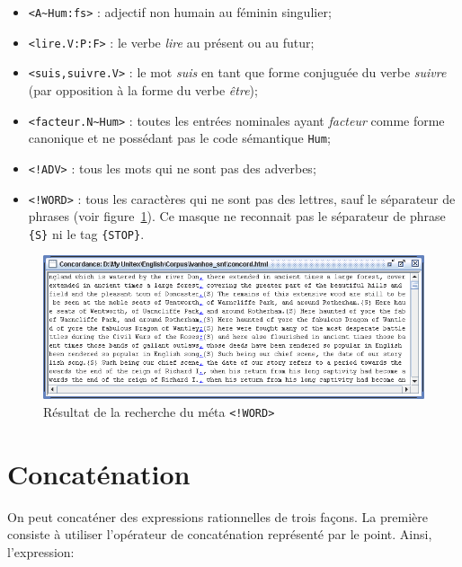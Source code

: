 \begin{itemize}
  \item \verb$<A~Hum:fs>$ : adjectif non humain au féminin singulier;
  \item \verb+<lire.V:P:F>+ : le verbe \textit{lire} au présent ou au futur;
  \item \verb$<suis,suivre.V>$ : le mot \textit{suis} en tant que forme conjuguée du verbe
  	  \textit{suivre}
  	  (par opposition à la forme du verbe \textit{être});
  \item \verb$<facteur.N~Hum>$ : toutes les entrées nominales ayant \textit{facteur} comme forme
  	  canonique et ne possédant pas le code sémantique \verb+Hum+;
  \item \verb$<!ADV>$ : tous les mots qui ne sont pas des adverbes;
  \item \verb$<!WORD>$ : tous les caractères qui ne sont pas des lettres, sauf le séparateur de
  	  phrases
  	  (voir figure~\ref{fig-search-<!WORD>}). Ce masque ne reconnait pas le séparateur de phrase
  	  \verb+{S}+
  	  ni le tag \verb+{STOP}+.
\end{itemize}

\bigskip
\begin{figure}[!ht]
\begin{center}
\includegraphics[width=15cm]{resources/img/fig4-2.png}
\caption{Résultat de la recherche du méta
\texttt{<!WORD>}\label{fig-search-<!WORD>}}
\end{center}
\end{figure}

\section{Concaténation}

On peut concaténer des expressions rationnelles de trois façons. La première consiste à
utiliser l’opérateur de concaténation représenté par le point. Ainsi, l’expression:

